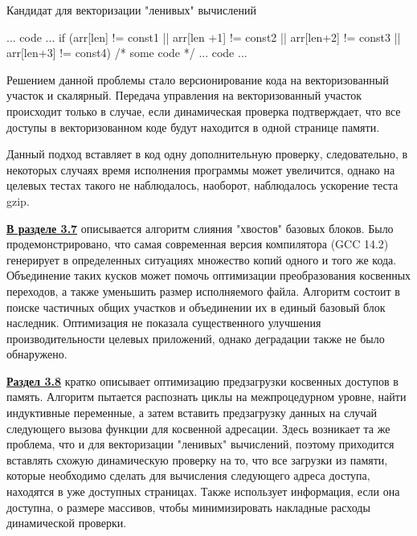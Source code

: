    \begin{ListingEnv}[!h]
  	\captiondelim{ } %
  	\caption{Кандидат для векторизации "ленивых"\phantom{ } вычислений}\label{lcv1}
  	
  	\begin{Verb}
	... code ...
	if (arr[len] != const1 || arr[len +1] != const2 
		|| arr[len+2] != const3  || arr[len+3] != const4) {
		/* some code */
	}
	... code ...
  	\end{Verb}
  \end{ListingEnv}
 
Решением данной проблемы стало версионирование кода на векторизованный участок и скалярный.  Передача управления на векторизованный участок происходит  только в случае, если динамическая проверка подтверждает, что все доступы в векторизованном коде будут находится в одной странице памяти.
 
 Данный подход вставляет в код одну дополнительную проверку, следовательно,
 в некоторых случаях время исполнения программы может увеличится,
 однако на целевых тестах такого не наблюдалось, наоборот, наблюдалось ускорение
 теста gzip.
 
  \underline{\textbf{В разделе 3.7}} описывается алгоритм слияния "хвостов"\phantom{ } базовых блоков.  Было продемонстрировано, что самая  современная версия компилятора (GCC 14.2) генерирует в определенных ситуациях множество копий одного и того же кода. Объединение таких кусков может помочь оптимизации преобразования косвенных переходов, а также уменьшить размер исполняемого файла.  Алгоритм состоит в поиске частичных общих участков и объединении их  в единый базовый блок наследник.  Оптимизация  не показала существенного улучшения производительности целевых приложений, однако деградации также не было обнаружено.
 
 \underline{\textbf{Раздел 3.8}} кратко описывает оптимизацию предзагрузки косвенных доступов в память. Алгоритм пытается распознать циклы на межпроцедурном уровне, найти индуктивные переменные, а затем вставить предзагрузку данных на случай следующего вызова функции для косвенной адресации. Здесь возникает та же проблема, что и для векторизации "ленивых"\phantom{ } вычислений, поэтому приходится вставлять схожую динамическую проверку на то, что все загрузки из памяти, которые необходимо сделать для вычисления следующего адреса доступа, находятся в уже доступных страницах. Также использует информация, если она доступна, о размере массивов, чтобы минимизировать накладные расходы динамической проверки.
 

